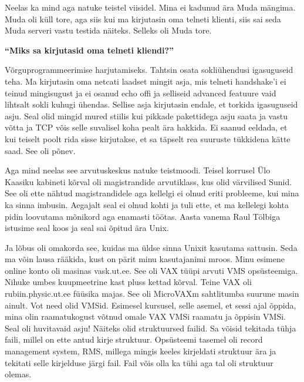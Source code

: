 Neelas ka mind aga natuke teistel viisidel. Mina ei kadunud ära Muda mängima. Muda oli küll tore, aga siis kui ma kirjutasin oma telneti klienti, siis sai seda Muda serveri vastu testida näiteks. Selleks oli Muda tore. 

\textbf{\enquote{Miks sa kirjutasid oma telneti kliendi?}} 

Võrguprogrammeerimise harjutamiseks. Tahtsin osata sokliühendusi igasuguseid teha. Ma kirjutasin oma netcati laadset mingit asja, mis telneti handshake'i ei teinud mingisugust ja ei osanud echo offi ja selliseid advanced featuure vaid lihtsalt sokli kuhugi ühendas. Sellise asja kirjutasin endale, et torkida igasuguseid asju. Seal olid mingid mured stiilis kui pikkade pakettidega asju saata ja vastu võtta ja TCP võis selle suvalisel koha pealt ära hakkida. Ei saanud eeldada, et kui teiselt poolt rida sisse kirjutakse, et sa täpselt rea suuruste tükkidena kätte saad. See oli põnev.

Aga mind neelas see arvutuskeskus natuke teistmoodi. Teisel korrusel Ülo Kaasiku kabineti kõrval oli magistrandide arvutiklass, kus olid värvilised Sunid. See oli ette nähtud magistrandidele aga kellelgi ei olnud eriti probleeme, kui mina ka sinna imbusin. Aegajalt seal ei olnud kohti ja tuli ette, et ma kellelegi kohta pidin loovutama mõnikord aga enamasti töötas. Aasta vanema Raul Tölbiga istusime seal koos ja seal sai õpitud ära Unix. 

Ja lõbus oli omakorda see, kuidas ma üldse sinna Unixit kasutama sattusin. Seda ma võin lausa rääkida, kust on pärit minu kasutajanimi mroos. Minu esimene online konto oli masinas vask.ut.ee. See oli VAX tüüpi arvuti VMS opsüsteemiga. Nihuke umbes kuupmeetrine kast pluss kettad kõrval. Teine VAX oli rubiin.physic.ut.ee füüsika majas. See oli MicroVAXm sahtlitumba suurune masin ainult. Vot need olid VMSid. Esimesel kursusel, selle asemel, et sessi ajal õppida, mina olin raamatukogust võtnud omale VAX VMSi raamatu ja õppisin VMSi. Seal oli huvitavaid asju! Näiteks olid struktuursed failid. Sa võisid tekitada tühja faili, millel on ette antud kirje struktuur. Opsüsteemi tasemel oli record management system, RMS, millega mingis keeles kirjeldati struktuur ära ja tekitati selle kirjelduse järgi fail. Fail võis olla ka tühi aga tal oli struktuur olemas. 

